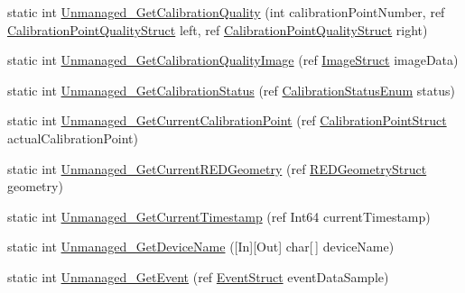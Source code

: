 \begin{DoxyCompactItemize}
\item 
static int \hyperlink{class_web_analyzer_1_1_eye_tracking_1_1_eye_tracking_controller_ae6f4df38c9e9baae14fac0b57bd031da}{Unmanaged\+\_\+\+Get\+Calibration\+Quality} (int calibration\+Point\+Number, ref \hyperlink{struct_web_analyzer_1_1_eye_tracking_1_1_eye_tracking_controller_1_1_calibration_point_quality_struct}{Calibration\+Point\+Quality\+Struct} left, ref \hyperlink{struct_web_analyzer_1_1_eye_tracking_1_1_eye_tracking_controller_1_1_calibration_point_quality_struct}{Calibration\+Point\+Quality\+Struct} right)
\item 
static int \hyperlink{class_web_analyzer_1_1_eye_tracking_1_1_eye_tracking_controller_a06b91ca4c54e5e829ef5f756abed6c64}{Unmanaged\+\_\+\+Get\+Calibration\+Quality\+Image} (ref \hyperlink{struct_web_analyzer_1_1_eye_tracking_1_1_eye_tracking_controller_1_1_image_struct}{Image\+Struct} image\+Data)
\item 
static int \hyperlink{class_web_analyzer_1_1_eye_tracking_1_1_eye_tracking_controller_a1937ad3c4e84077927f422f79296f367}{Unmanaged\+\_\+\+Get\+Calibration\+Status} (ref \hyperlink{class_web_analyzer_1_1_eye_tracking_1_1_eye_tracking_controller_a22313637b693bb7b9fd30e2d549c3eeb}{Calibration\+Status\+Enum} status)
\item 
static int \hyperlink{class_web_analyzer_1_1_eye_tracking_1_1_eye_tracking_controller_a7e294dd4769ec2d0204d167a8308434d}{Unmanaged\+\_\+\+Get\+Current\+Calibration\+Point} (ref \hyperlink{struct_web_analyzer_1_1_eye_tracking_1_1_eye_tracking_controller_1_1_calibration_point_struct}{Calibration\+Point\+Struct} actual\+Calibration\+Point)
\item 
static int \hyperlink{class_web_analyzer_1_1_eye_tracking_1_1_eye_tracking_controller_a65949adae3e4d4e57e647e37b4a3240c}{Unmanaged\+\_\+\+Get\+Current\+R\+E\+D\+Geometry} (ref \hyperlink{struct_web_analyzer_1_1_eye_tracking_1_1_eye_tracking_controller_1_1_r_e_d_geometry_struct}{R\+E\+D\+Geometry\+Struct} geometry)
\item 
static int \hyperlink{class_web_analyzer_1_1_eye_tracking_1_1_eye_tracking_controller_ae5d5631a24103fb584822943961a25f4}{Unmanaged\+\_\+\+Get\+Current\+Timestamp} (ref Int64 current\+Timestamp)
\item 
static int \hyperlink{class_web_analyzer_1_1_eye_tracking_1_1_eye_tracking_controller_a1f47e01bfb3b9929a7159bb578635795}{Unmanaged\+\_\+\+Get\+Device\+Name} (\mbox{[}In\mbox{]}\mbox{[}Out\mbox{]} char\mbox{[}$\,$\mbox{]} device\+Name)
\item 
static int \hyperlink{class_web_analyzer_1_1_eye_tracking_1_1_eye_tracking_controller_a574d8ce2bd6dfc762847caf75e6cfac8}{Unmanaged\+\_\+\+Get\+Event} (ref \hyperlink{struct_web_analyzer_1_1_eye_tracking_1_1_eye_tracking_controller_1_1_event_struct}{Event\+Struct} event\+Data\+Sample)

\end{DoxyCompactItemize}
